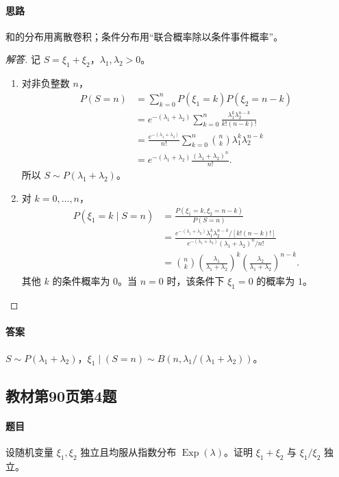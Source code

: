\paragraph{思路}和的分布用离散卷积；条件分布用“联合概率除以条件事件概率”。
\begin{proof}[解答]
记 $S=\xi_1+\xi_2$，$\lambda_1,\lambda_2>0$。
\begin{enumerate}
\item 对非负整数 $n$，
\begin{align*}
P(S=n)
&=\sum_{k=0}^nP(\xi_1=k)P(\xi_2=n-k)\\
&=e^{-(\lambda_1+\lambda_2)}\sum_{k=0}^n
\frac{\lambda_1^k\lambda_2^{n-k}}{k!(n-k)!}\\
&=\frac{e^{-(\lambda_1+\lambda_2)}}{n!}
\sum_{k=0}^n\binom nk\lambda_1^k\lambda_2^{n-k}\\
&=e^{-(\lambda_1+\lambda_2)}\frac{(\lambda_1+\lambda_2)^n}{n!}.
\end{align*}
所以 $S\sim P(\lambda_1+\lambda_2)$。
\item 对 $k=0,\ldots,n$，
\begin{align*}
P(\xi_1=k\mid S=n)
&=\frac{P(\xi_1=k,\xi_2=n-k)}{P(S=n)}\\
&=\frac{e^{-(\lambda_1+\lambda_2)}
\lambda_1^k\lambda_2^{n-k}/[k!(n-k)!]}
{e^{-(\lambda_1+\lambda_2)}(\lambda_1+\lambda_2)^n/n!}\\
&=\binom nk\left(\frac{\lambda_1}{\lambda_1+\lambda_2}\right)^k
\left(\frac{\lambda_2}{\lambda_1+\lambda_2}\right)^{n-k}.
\end{align*}
其他 $k$ 的条件概率为 $0$。当 $n=0$ 时，该条件下 $\xi_1=0$ 的概率为 $1$。
\end{enumerate}
\end{proof}
\paragraph{答案}$S\sim P(\lambda_1+\lambda_2)$，$\xi_1\mid(S=n)\sim B(n,\lambda_1/(\lambda_1+\lambda_2))$。

\subsection{教材第90页第4题}\label{ex:w12-b90-4}
\paragraph{题目}
设随机变量 $\xi_1,\xi_2$ 独立且均服从指数分布 $\operatorname{Exp}(\lambda)$。证明 $\xi_1+\xi_2$ 与 $\xi_1/\xi_2$ 独立。
